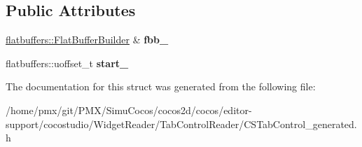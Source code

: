 \subsection*{Public Attributes}
\begin{DoxyCompactItemize}
\item 
\mbox{\label{structflatbuffers_1_1TabHeaderOptionBuilder_abb69e7b158fd0674cbf6b2422334ad13}} 
\hyperlink{classflatbuffers_1_1FlatBufferBuilder}{flatbuffers\+::\+Flat\+Buffer\+Builder} \& {\bfseries fbb\+\_\+}
\item 
\mbox{\label{structflatbuffers_1_1TabHeaderOptionBuilder_af32bead5050856fd5e026bf737572104}} 
flatbuffers\+::uoffset\+\_\+t {\bfseries start\+\_\+}
\end{DoxyCompactItemize}


The documentation for this struct was generated from the following file\+:\begin{DoxyCompactItemize}
\item 
/home/pmx/git/\+P\+M\+X/\+Simu\+Cocos/cocos2d/cocos/editor-\/support/cocostudio/\+Widget\+Reader/\+Tab\+Control\+Reader/C\+S\+Tab\+Control\+\_\+generated.\+h\end{DoxyCompactItemize}
